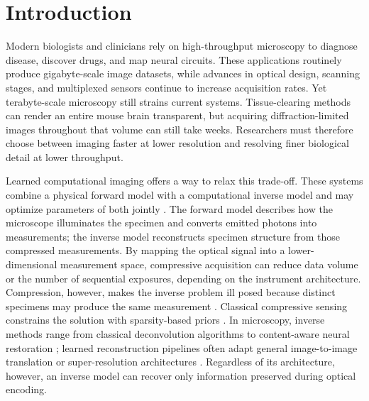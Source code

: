 \documentclass{optica-article}
\begin{document}
\section{Introduction}

Modern biologists and clinicians rely on high-throughput microscopy to diagnose disease, discover drugs, and map neural circuits. These applications routinely produce gigabyte-scale image datasets, while advances in optical design, scanning stages, and multiplexed sensors continue to increase acquisition rates. Yet terabyte-scale microscopy still strains current systems. Tissue-clearing methods can render an entire mouse brain transparent, but acquiring diffraction-limited images throughout that volume can still take weeks. Researchers must therefore choose between imaging faster at lower resolution and resolving finer biological detail at lower throughput.

Learned computational imaging offers a way to relax this trade-off. These systems combine a physical forward model with a computational inverse model and may optimize parameters of both jointly \cite{chakrabarti2016learning,cheng2019illumination,cooke2021physics, diamond2021dirty,hershko2019multicolor,kellman2019data}. The forward model describes how the microscope illuminates the specimen and converts emitted photons into measurements; the inverse model reconstructs specimen structure from those compressed measurements. By mapping the optical signal into a lower-dimensional measurement space, compressive acquisition can reduce data volume or the number of sequential exposures, depending on the instrument architecture. Compression, however, makes the inverse problem ill posed because distinct specimens may produce the same measurement \cite{pronina2020microscopy}. Classical compressive sensing constrains the solution with sparsity-based priors \cite{candes2008introduction, donoho2006compressed, duarte2008single, studer2012compressive}. In microscopy, inverse methods range from classical deconvolution algorithms \cite{schaefer2001generalized, van1997quantitative, verveer1999comparison} to content-aware neural restoration \cite{weigert2018content}; learned reconstruction pipelines often adapt general image-to-image translation or super-resolution architectures \cite{isola2017image, liang2021swinir}. Regardless of its architecture, however, an inverse model can recover only information preserved during optical encoding.
\end{document}
